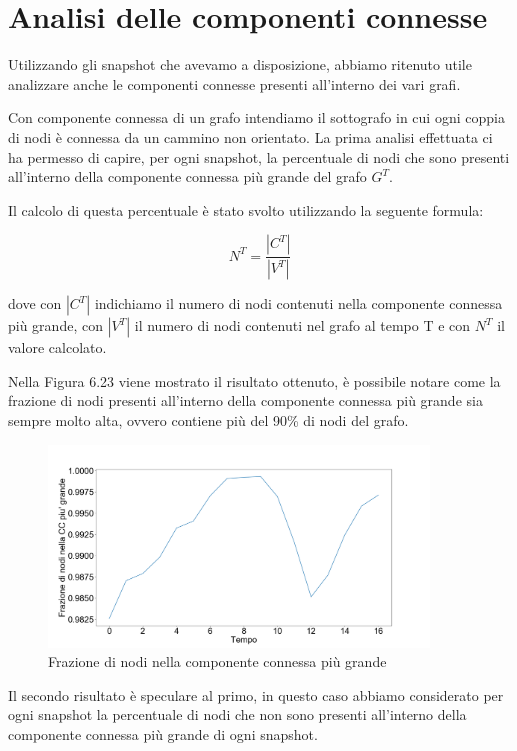 \documentclass[12pt]{report}
\begin{document}
\newpage
\section{Analisi delle componenti connesse}



Utilizzando gli snapshot che avevamo a disposizione, abbiamo ritenuto utile analizzare anche le componenti connesse presenti all'interno dei vari grafi.

Con componente connessa di un grafo intendiamo il sottografo in cui ogni coppia di nodi è connessa da un cammino non orientato.
La prima analisi effettuata ci ha permesso di capire, per ogni snapshot, la percentuale di nodi che sono presenti all'interno della componente connessa più grande del grafo $G^T$.

Il calcolo di questa percentuale è stato svolto utilizzando la seguente formula:

\begin{equation}
    N^T = \frac{|C^T|}{|V^T|}
\end{equation}

dove con $|C^T|$ indichiamo il numero di nodi contenuti nella componente connessa più grande, con $|V^T|$ il numero di nodi contenuti nel grafo al tempo T e con $N^T$ il valore calcolato.

Nella Figura 6.23 viene mostrato il risultato ottenuto, è possibile notare come la frazione di nodi presenti all'interno della componente connessa più grande sia sempre molto alta, ovvero contiene più del 90\% di nodi del grafo.

\begin{figure}[H]
    \centering\includegraphics[width=0.9\textwidth]{GiantCC.png}
    \caption{Frazione di nodi nella componente connessa più grande}
\end{figure}

Il secondo risultato  è speculare al primo, in questo caso abbiamo considerato per ogni snapshot la percentuale di nodi che non sono presenti all'interno della componente connessa più grande di ogni snapshot.
\end{document}
